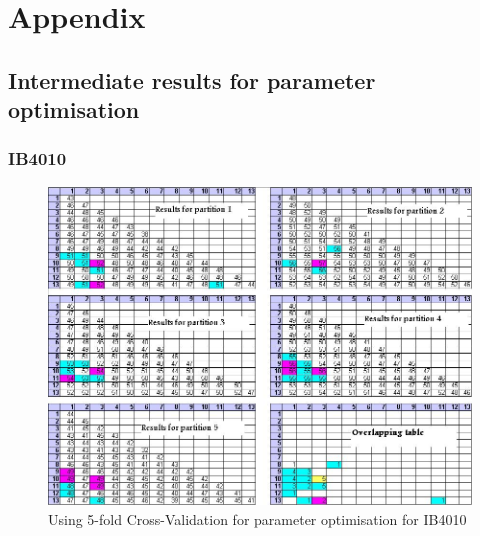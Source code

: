 \chapter*{Appendix}
\scriptsize
\section{Intermediate results for parameter optimisation}
\subsection{IB4010}
\begin{figure}[hb!]
\centering
\includegraphics[scale = 0.85]{IB4010_optimisation.jpg}
\caption{Using 5-fold Cross-Validation for parameter optimisation for IB4010}
\label{Using 5-fold Cross-Validation for parameter optimisation for IB4010}
\end{figure}

\pagebreak

